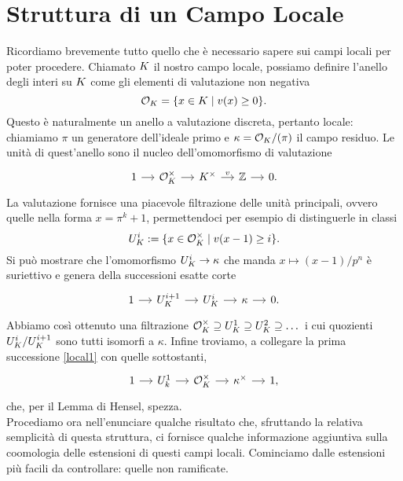 \section{Struttura di un Campo Locale}
Ricordiamo brevemente tutto quello che è necessario sapere sui campi locali per poter procedere. Chiamato $ K $ il nostro campo locale, possiamo definire l'anello degli interi su $ K $ come gli elementi di valutazione non negativa
\[ \mathcal{O}_{K} = \{ x \in K \mid v(x)\geq 0 \}. \]
Questo è naturalmente un anello a valutazione discreta, pertanto locale: chiamiamo $ \pi $ un generatore dell'ideale primo e $ \kappa = \mathcal{O}_{K}/(\pi) $ il campo residuo. Le unità di quest'anello sono il nucleo dell'omomorfismo di valutazione
\begin{equation}\label{local1}
	\begin{tikzcd}[column sep = small]
	1 \rar
	& \mathcal{O}_{\K}^\times \rar
	& \K^\times \rar["v"]
	& \Z \rar
	& 0.
	\end{tikzcd}
\end{equation}
La valutazione fornisce una piacevole filtrazione delle unità  principali, ovvero quelle nella forma $ x = \pi^k +1 $, permettendoci per esempio di distinguerle in classi  $$  U_{K}^i :=\{x \in \mathcal{O}_{K}^\times \mid v(x-1) \geq i \}.  $$ Si può mostrare che l'omomorfismo $ U_{K}^i \to \kappa $ che manda $ x \mapsto (x-1)/p^n $ è suriettivo e genera della successioni esatte corte
\begin{equation}\label{local2}
\begin{tikzcd}[column sep = small]
1 \rar
& U_K^{i+1} \rar
& U_{K}^i \rar
& \kappa \rar
& 0.
\end{tikzcd}
\end{equation}
Abbiamo così ottenuto una filtrazione $ \mathcal{O}_{K}^\times \supseteq U_{K}^1 \supseteq U_{K}^2 \supseteq \dots $ 
i cui quozienti $ U_{K}^i / U_{K}^{i+1} $ sono tutti isomorfi a $ \kappa $.
Infine troviamo, a collegare la prima successione \eqref{local1} con quelle sottostanti, 
\begin{equation}\label{local3}
	\begin{tikzcd}[column sep = small]
	1 \rar
	& U_k^{1} \rar
	& \mathcal{O}_{\K}^\times \rar
	& \kappa^\times \rar
	&1,
	\end{tikzcd}
\end{equation}
che, per il Lemma di Hensel, spezza.\\

Procediamo ora nell'enunciare qualche risultato che, sfruttando la relativa semplicità di questa struttura, ci fornisce qualche informazione aggiuntiva sulla coomologia delle estensioni di questi campi locali. Cominciamo dalle estensioni più facili da controllare: quelle non ramificate.

